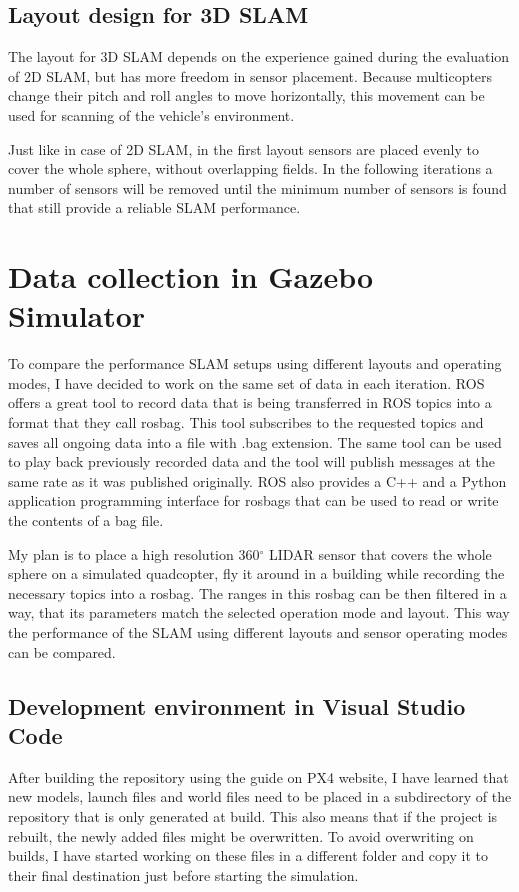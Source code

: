 \subsection{Layout design for 3D SLAM}
The layout for 3D SLAM depends on the experience gained during the evaluation of 2D SLAM, but has more 
freedom in sensor placement. Because multicopters change their pitch and roll angles to move horizontally,
this movement can be used for scanning of the vehicle's environment. 

Just like in case of 2D SLAM, in the first layout sensors are placed evenly to cover the whole sphere,
without overlapping fields. In the following iterations a number of sensors will be removed until the 
minimum number of sensors is found that still provide a reliable SLAM performance.



\section{Data collection in Gazebo Simulator}
To compare the performance SLAM setups using different layouts and operating modes, I have decided to 
work on the same set of data in each iteration. ROS offers a great tool to record data that is being 
transferred in ROS topics into a format that they call rosbag. This tool subscribes to the requested
topics and saves all ongoing data into a file with .bag extension. The same tool can be used to play 
back previously recorded data and the tool will publish messages at the same rate as it was 
published originally. ROS also provides a C++ and a Python application programming interface for rosbags
that can be used to read or write the contents of a bag file.

My plan is to place a high resolution 360$^{\circ}$ LIDAR sensor that covers the whole sphere
on a simulated quadcopter, fly it around in a building while recording the necessary topics into a rosbag.
The ranges in this rosbag can be then filtered in a way, that its parameters match the selected operation 
mode and layout. This way the performance of the SLAM using different layouts and sensor operating modes
can be compared.



\subsection{Development environment in Visual Studio Code}
After building the repository using the guide on PX4 website, I have learned that new models, launch files
and world files need to be placed in a subdirectory of the repository that is only generated at build. This
also means that if the project is rebuilt, the newly added files might be overwritten. To avoid overwriting
on builds, I have started working on these files in a different folder and copy it to their final destination
just before starting the simulation. 

